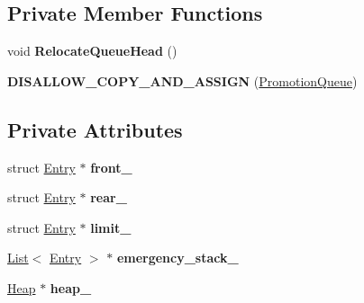 \subsection*{Private Member Functions}
\begin{DoxyCompactItemize}
\item 
void {\bfseries Relocate\+Queue\+Head} ()\hypertarget{classv8_1_1internal_1_1_promotion_queue_a26a18badb37a4dc3233ae1c374b9437e}{}\label{classv8_1_1internal_1_1_promotion_queue_a26a18badb37a4dc3233ae1c374b9437e}

\item 
{\bfseries D\+I\+S\+A\+L\+L\+O\+W\+\_\+\+C\+O\+P\+Y\+\_\+\+A\+N\+D\+\_\+\+A\+S\+S\+I\+GN} (\hyperlink{classv8_1_1internal_1_1_promotion_queue}{Promotion\+Queue})\hypertarget{classv8_1_1internal_1_1_promotion_queue_acfeb496a1732883314aee0e09778011b}{}\label{classv8_1_1internal_1_1_promotion_queue_acfeb496a1732883314aee0e09778011b}

\end{DoxyCompactItemize}
\subsection*{Private Attributes}
\begin{DoxyCompactItemize}
\item 
struct \hyperlink{structv8_1_1internal_1_1_promotion_queue_1_1_entry}{Entry} $\ast$ {\bfseries front\+\_\+}\hypertarget{classv8_1_1internal_1_1_promotion_queue_af8dc88cccfda891234d5a7883eee49db}{}\label{classv8_1_1internal_1_1_promotion_queue_af8dc88cccfda891234d5a7883eee49db}

\item 
struct \hyperlink{structv8_1_1internal_1_1_promotion_queue_1_1_entry}{Entry} $\ast$ {\bfseries rear\+\_\+}\hypertarget{classv8_1_1internal_1_1_promotion_queue_a6b2619d919eabae7afb51ae0decaf5cc}{}\label{classv8_1_1internal_1_1_promotion_queue_a6b2619d919eabae7afb51ae0decaf5cc}

\item 
struct \hyperlink{structv8_1_1internal_1_1_promotion_queue_1_1_entry}{Entry} $\ast$ {\bfseries limit\+\_\+}\hypertarget{classv8_1_1internal_1_1_promotion_queue_af900c75eca7fefb7288fa0812a470c0d}{}\label{classv8_1_1internal_1_1_promotion_queue_af900c75eca7fefb7288fa0812a470c0d}

\item 
\hyperlink{classv8_1_1internal_1_1_list}{List}$<$ \hyperlink{structv8_1_1internal_1_1_promotion_queue_1_1_entry}{Entry} $>$ $\ast$ {\bfseries emergency\+\_\+stack\+\_\+}\hypertarget{classv8_1_1internal_1_1_promotion_queue_a99b0a12d7f949b1335f1399af7bc6f2e}{}\label{classv8_1_1internal_1_1_promotion_queue_a99b0a12d7f949b1335f1399af7bc6f2e}

\item 
\hyperlink{classv8_1_1internal_1_1_heap}{Heap} $\ast$ {\bfseries heap\+\_\+}\hypertarget{classv8_1_1internal_1_1_promotion_queue_a81364e55421f72ed149c9fb33d70d8ff}{}\label{classv8_1_1internal_1_1_promotion_queue_a81364e55421f72ed149c9fb33d70d8ff}

\end{DoxyCompactItemize}



